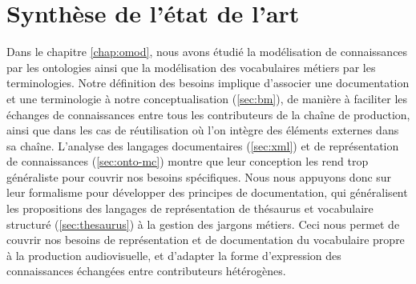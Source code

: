 \minitoc

\section{Synthèse de l'état de l'art}\label{sec:synthese}
Dans le chapitre \ref{chap:omod}, nous avons étudié la modélisation de connaissances par les ontologies ainsi que la modélisation des vocabulaires métiers par les terminologies. 
Notre définition des besoins implique d'associer une documentation et une terminologie à notre conceptualisation (\ref{sec:bm}), de manière à faciliter les échanges de connaissances entre tous les contributeurs de la chaîne de production, ainsi que dans les cas de réutilisation où l'on intègre des éléments externes dans sa chaîne.
L'analyse des langages documentaires (\ref{sec:xml}) et de représentation de connaissances (\ref{sec:onto-mc}) montre que leur conception les rend trop généraliste pour couvrir nos besoins spécifiques. 
Nous nous appuyons donc sur leur formalisme pour développer des principes de documentation, qui généralisent les propositions des langages de représentation de thésaurus et vocabulaire structuré (\ref{sec:thesaurus}) à la gestion des jargons métiers.
Ceci nous permet de couvrir nos besoins de représentation et de documentation du vocabulaire propre à la production audiovisuelle, et  d'adapter la forme d'expression des connaissances échangées entre contributeurs hétérogènes.


